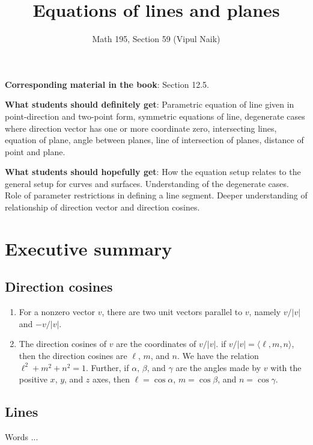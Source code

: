 \documentclass[10pt]{amsart}
\title{Equations of lines and planes}
\author{Math 195, Section 59 (Vipul Naik)}
\begin{document}
\maketitle

{\bf Corresponding material in the book}: Section 12.5.

{\bf What students should definitely get}: Parametric equation of line
given in point-direction and two-point form, symmetric equations of
line, degenerate cases where direction vector has one or more
coordinate zero, intersecting lines, equation of plane, angle between
planes, line of intersection of planes, distance of point and plane.

{\bf What students should hopefully get}: How the equation setup
relates to the general setup for curves and surfaces. Understanding of
the degenerate cases. Role of parameter restrictions in defining a
line segment. Deeper understanding of relationship of direction vector
and direction cosines.


\section*{Executive summary}

\subsection{Direction cosines}

\begin{enumerate}
\item For a nonzero vector $v$, there are two unit vectors parallel to
  $v$, namely $v/|v|$ and $-v/|v|$.
\item The direction cosines of $v$ are the coordinates of $v/|v|$. if
  $v/|v| = \langle \ell,m,n \rangle$, then the direction cosines are
  $\ell$, $m$, and $n$. We have the relation $\ell^2 + m^2 + n^2 =
  1$. Further, if $\alpha$, $\beta$, and $\gamma$ are the angles made
  by $v$ with the positive $x$, $y$, and $z$ axes, then $\ell = \cos
  \alpha$, $m = \cos \beta$, and $n = \cos \gamma$.
\end{enumerate}

\subsection{Lines}
Words ...
\end{document}
